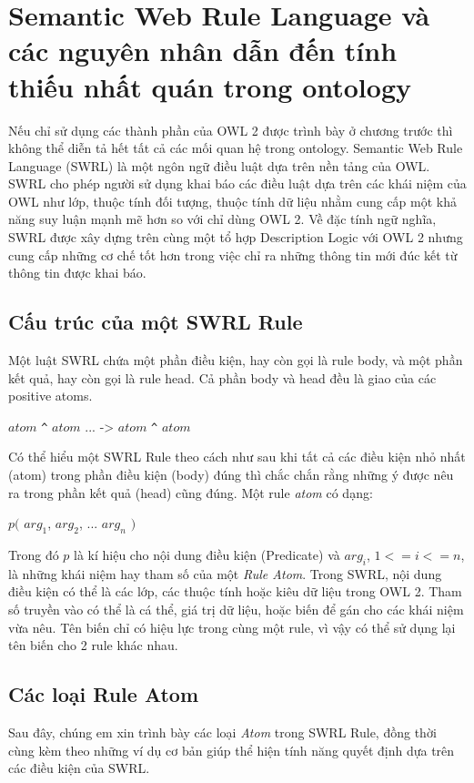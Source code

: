 \chapter{Semantic Web Rule Language và các nguyên nhân dẫn đến tính thiếu nhất quán trong ontology}
Nếu chỉ sử dụng các thành phần của  OWL 2 được trình bày ở chương trước thì không thể diễn tả hết tất cả các mối quan hệ trong ontology. Semantic Web Rule Language (SWRL) là một ngôn ngữ điều luật dựa trên nền tảng của OWL. SWRL cho phép người sử dụng khai báo các điều luật dựa trên các khái niệm của OWL như lớp, thuộc tính đối tượng, thuộc tính dữ liệu nhằm cung cấp một khả năng suy luận mạnh mẽ hơn so với chỉ dùng OWL 2. Về đặc tính ngữ nghĩa, SWRL được xây dựng trên cùng một tổ hợp Description Logic với OWL 2 nhưng cung cấp những cơ chế tốt hơn trong việc chỉ ra những thông tin mới đúc kết từ thông tin được khai báo.

\section{Cấu trúc của một SWRL Rule \cite{swrlfaq}}
Một luật SWRL chứa một phần điều kiện, hay còn gọi là rule body, và một phần kết quả, hay còn gọi là rule head. Cả phần body và head đều là giao của các positive atoms.
\begin{center}
$atom$ \verb|^| $atom$ ... -> $atom$ \verb|^| $atom$ 
\end{center}
Có thể hiểu một SWRL Rule theo cách như sau khi tất cả các điều kiện nhỏ nhất (atom) trong phần điều kiện (body) đúng thì chắc chắn rằng những ý được nêu ra trong phần kết quả (head) cũng đúng. Một rule \textit{atom} có dạng:
\begin{center}
$p($ $arg_{1}$, $arg_{2}$, ... $arg_{n}$ $)$
\end{center}
Trong đó $p$ là kí hiệu cho nội dung điều kiện (Predicate) và $arg_{i}$, $1<=i<=n$, là những khái niệm hay tham số của một \textit{Rule Atom}. Trong SWRL, nội dung điều kiện có thể là các lớp, các thuộc tính hoặc kiêu dữ liệu trong OWL 2. Tham số truyền vào có thể là cá thể, giá trị dữ liệu, hoặc biến để gán cho các khái niệm vừa nêu. Tên biến chỉ có hiệu lực trong cùng một rule, vì vậy có thể sử dụng lại tên biến cho 2 rule khác nhau.
\section{Các loại Rule Atom}
Sau đây, chúng em xin trình bày các loại \textit{Atom} trong SWRL Rule, đồng thời cùng kèm theo những ví dụ cơ bản giúp thể hiện tính năng quyết định dựa trên các điều kiện của SWRL.
